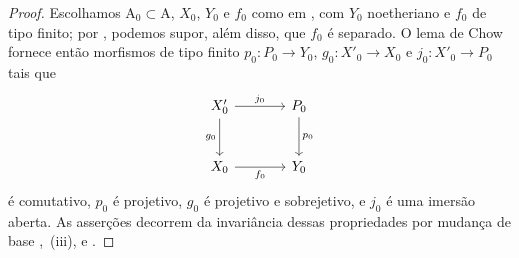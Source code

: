 \begin{proof}
Escolhamos $\mathrm{A}_0\subset\mathrm{A}$, $X_0$, $Y_0$ e $f_0$ como em , com $Y_0$ noetheriano e $f_0$ de tipo finito; por , podemos supor, além disso, que $f_0$ é separado. O lema de Chow  fornece então morfismos de tipo finito $p_0:P_0\to Y_0$, $g_0:X'_0\to X_0$ e $j_0:X'_0\to P_0$ tais que
\[
\begin{tikzcd}[column sep=large,row sep=large]
X'_0 \arrow[r,"j_0"] \arrow[d,"g_0"'] & P_0 \arrow[d,"p_0"] \\
X_0 \arrow[r,"f_0"'] & Y_0
\end{tikzcd}
\]
é comutativo, $p_0$ é projetivo, $g_0$ é projetivo e sobrejetivo, e $j_0$ é uma imersão aberta. As asserções decorrem da invariância dessas propriedades por mudança de base ,~(iii),  e .
\end{proof}

